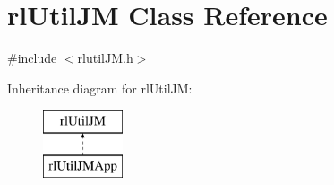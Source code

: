 \hypertarget{classrl_util_j_m}{}\section{rl\+Util\+JM Class Reference}
\label{classrl_util_j_m}


{\ttfamily \#include $<$rlutil\+J\+M.\+h$>$}

Inheritance diagram for rl\+Util\+JM\+:\begin{figure}[H]
\begin{center}
\leavevmode
\includegraphics[height=2.000000cm]{classrl_util_j_m}
\end{center}
\end{figure}
